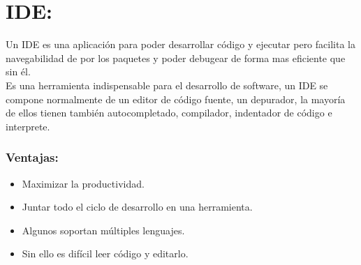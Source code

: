 \begin{table}[]
\centering
\caption{Tabla comparativa de herramientas}
\label{tb:1}
\end{table}
\section{IDE:}
Un IDE es una aplicación para poder desarrollar código y ejecutar pero facilita la navegabilidad de por los paquetes y poder debugear de forma mas eficiente que sin él.\\
Es una herramienta indispensable para el desarrollo de software, un IDE se compone normalmente de un editor de código fuente, un depurador, la mayoría de ellos tienen también autocompletado, compilador, indentador de código e interprete.

\subsubsection{Ventajas:}
\begin{itemize}
	\item Maximizar la productividad.
	\item Juntar todo el ciclo de desarrollo en una herramienta.
	\item Algunos soportan múltiples lenguajes. 
	\item Sin ello es difícil leer código y editarlo.
\end{itemize}

